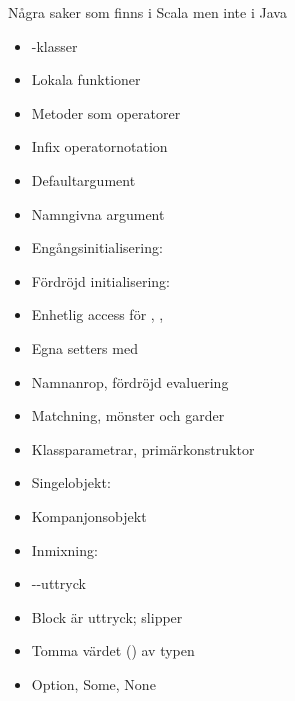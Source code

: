\begin{Slide}{Några saker som finns i Scala men inte i Java}\SlideFontSmall
\vspace{-1em}\begin{multicols}{2}
\begin{itemize}
\item {}-klasser

\item Lokala funktioner

\item Metoder som operatorer 

\item Infix operatornotation

\item Defaultargument

\item Namngivna argument

\item Engångsinitialisering: 

\item Fördröjd initialisering: 

\item Enhetlig access för , , 

\item Egna setters med 

\item Namnanrop, fördröjd evaluering

\item Matchning, mönster och garder

\item Klassparametrar, primärkonstruktor

\item Singelobjekt: 

\item Kompanjonsobjekt

\item Inmixning:  

\item {}--uttryck

\item Block är uttryck; slipper 

\item Tomma värdet () av typen 

\item Option, Some, None


\end{itemize}
\end{multicols}
\end{Slide}
